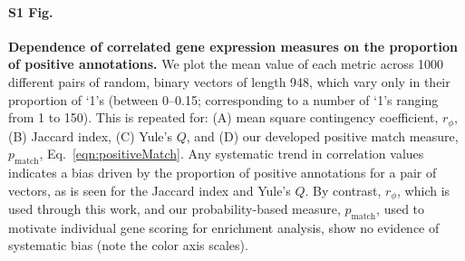 \documentclass[10pt,letterpaper]{article}
\begin{document}
\clearpage




\paragraph*{S1 Fig.}
\label{S1_Fig}
{\bf Dependence of correlated gene expression measures on the proportion of positive annotations.} We plot the mean value of each metric across 1000 different pairs of random, binary vectors of length 948, which vary only in their proportion of `1's (between 0--0.15; corresponding to a number of `1's ranging from 1 to 150).
This is repeated for:
(A) mean square contingency coefficient, $r_\phi$,
(B) Jaccard index,
(C) Yule's $Q$, and
(D) our developed positive match measure, $p_\mathrm{match}$, Eq.~\eqref{eqn:positiveMatch}.
Any systematic trend in correlation values indicates a bias driven by the proportion of positive annotations for a pair of vectors, as is seen for the Jaccard index and Yule's $Q$.
By contrast, $r_\phi$, which is used through this work, and our probability-based measure, $p_\mathrm{match}$, used to motivate individual gene scoring for enrichment analysis, show no evidence of systematic bias (note the color axis scales).

\end{document}
